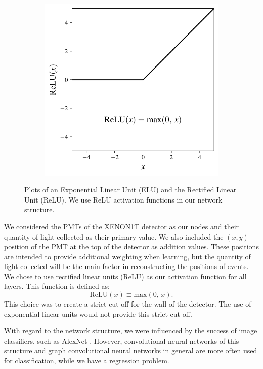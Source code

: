 \documentclass[../thesis.tex]{subfiles}
\begin{document}
\begin{figure}[t]
\begin{subfigure}{0.49\textwidth}
		\includegraphics[width=\textwidth]{figures/relu.pdf}
	\end{subfigure}
	\caption{
	Plots of an Exponential Linear Unit (ELU) and the Rectified Linear Unit (ReLU).
	We use ReLU activation functions in our network structure.
	}
	\label{fig:relu-elu}
\end{figure}
\par We considered the PMTs of the XENON1T detector as our nodes and their quantity of light collected as their primary value.
We also included the $(x,y)$ position of the PMT at the top of the detector as addition values.
These positions are intended to provide additional weighting when learning, but the quantity of light collected will be the main factor in reconstructing the positions of events.
We chose to use rectified linear units (ReLU) as our activation function for all layers.
This function is defined as:
\begin{equation}
	\text{ReLU}\left( x \right) \equiv \text{max}\left(0,\,x\right) .
\end{equation}
This choice was to create a strict cut off for the wall of the detector.
The use of exponential linear units would not provide this strict cut off.

\par With regard to the network structure, we were influenced by the success of image classifiers, such as AlexNet \cite{AlexNet}.
However, convolutional neural networks of this structure and graph convolutional neural networks in general are more often used for classification, while we have a regression problem.
\end{document}
